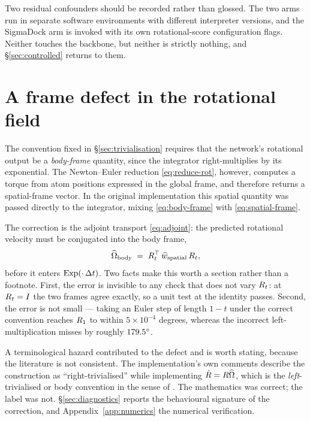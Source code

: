 Two residual confounders should be recorded rather than glossed. The two arms
run in separate software environments with different interpreter versions, and
the SigmaDock arm is invoked with its own rotational-score configuration
flags. Neither touches the backbone, but neither is strictly nothing, and
\S\ref{sec:controlled} returns to them.

\section{A frame defect in the rotational field}
\label{sec:frame-defect}

The convention fixed in \S\ref{sec:trivialisation} requires that the network's
rotational output be a \emph{body-frame} quantity, since the integrator
right-multiplies by its exponential. The Newton--Euler reduction
\eqref{eq:reduce-rot}, however, computes a torque from atom positions
expressed in the global frame, and therefore returns a spatial-frame vector.
In the original implementation this spatial quantity was passed directly to
the integrator, mixing \eqref{eq:body-frame} with \eqref{eq:spatial-frame}.

The correction is the adjoint transport \eqref{eq:adjoint}: the predicted
rotational velocity must be conjugated into the body frame,
\begin{equation}
  \widehat{\Omega}_{\mathrm{body}} \;=\; R_t^\top\,\widehat{w}_{\mathrm{spatial}}\,R_t ,
  \label{eq:frame-fix}
\end{equation}
before it enters $\operatorname{Exp}(\cdot\,\Delta t)$. Two facts make this worth a section
rather than a footnote. First, the error is invisible to any check that does
not vary $R_t$: at $R_t = I$ the two frames agree exactly, so a unit
test at the identity passes. Second, the error is not small --- taking an
Euler step of length $1-t$ under the correct convention reaches $R_1$ to
within $5\times10^{-4}$ degrees, whereas the incorrect left-multiplication
misses by roughly $179.5^{\circ}$.

A terminological hazard contributed to the defect and is worth stating,
because the literature is not consistent. The implementation's own comments
describe the construction as ``right-trivialised'' while implementing
$\dot{R} = R\widehat{\Omega}$, which is the \emph{left}-trivialised or
body convention in the sense of \citet{marsden1999introduction}. The
mathematics was correct; the label was not. \S\ref{sec:diagnostics} reports
the behavioural signature of the correction, and
Appendix~\ref{app:numerics} the numerical verification.

